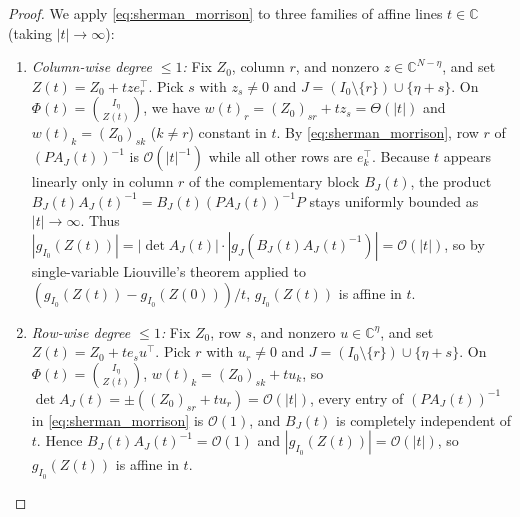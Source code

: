 \documentclass[11pt,a4paper]{article}
\theoremstyle{definition}
\newcommand{\C}{\mathbb{C}}
\begin{document}
\begin{proof}
We apply \eqref{eq:sherman_morrison} to three families of affine lines $t \in \C$ (taking $|t| \to \infty$):
\begin{enumerate}[leftmargin=1.5em]
  \item \emph{Column-wise degree $\le 1$:} Fix $Z_0$, column $r$, and nonzero $z \in \C^{N-\eta}$, and set $Z(t) = Z_0 + t z e_r^\top$. Pick $s$ with $z_s \neq 0$ and $J = (I_0 \setminus \{r\}) \cup \{\eta + s\}$. On $\Phi(t) = \binom{I_\eta}{Z(t)}$, we have $w(t)_r = (Z_0)_{sr} + t z_s = \Theta(|t|)$ and $w(t)_k = (Z_0)_{sk}$ ($k \neq r$) constant in $t$. By \eqref{eq:sherman_morrison}, row $r$ of $(P A_J(t))^{-1}$ is $\mathcal{O}(|t|^{-1})$ while all other rows are $e_k^\top$. Because $t$ appears linearly only in column $r$ of the complementary block $B_J(t)$, the product $B_J(t) A_J(t)^{-1} = B_J(t) (P A_J(t))^{-1} P$ stays uniformly bounded as $|t| \to \infty$. Thus $|g_{I_0}(Z(t))| = |\det A_J(t)| \cdot |g_J(B_J(t) A_J(t)^{-1})| = \mathcal{O}(|t|)$, so by single-variable Liouville's theorem applied to $(g_{I_0}(Z(t)) - g_{I_0}(Z(0)))/t$, $g_{I_0}(Z(t))$ is affine in $t$.
  \item \emph{Row-wise degree $\le 1$:} Fix $Z_0$, row $s$, and nonzero $u \in \C^\eta$, and set $Z(t) = Z_0 + t e_s u^\top$. Pick $r$ with $u_r \neq 0$ and $J = (I_0 \setminus \{r\}) \cup \{\eta + s\}$. On $\Phi(t) = \binom{I_\eta}{Z(t)}$, $w(t)_k = (Z_0)_{sk} + t u_k$, so $\det A_J(t) = \pm((Z_0)_{sr} + t u_r) = \mathcal{O}(|t|)$, every entry of $(P A_J(t))^{-1}$ in \eqref{eq:sherman_morrison} is $\mathcal{O}(1)$, and $B_J(t)$ is completely independent of $t$. Hence $B_J(t) A_J(t)^{-1} = \mathcal{O}(1)$ and $|g_{I_0}(Z(t))| = \mathcal{O}(|t|)$, so $g_{I_0}(Z(t))$ is affine in $t$.

\end{enumerate}
\end{proof}
\end{document}

